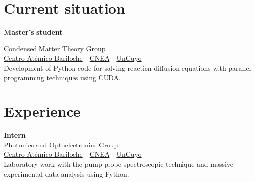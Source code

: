 \documentclass[a4paper,10pt]{article}
\begin{document}
\hfill
%
\begin{adjustbox}{valign=t}
\begin{minipage}{0.5\textwidth} %
\section*{Current situation}
\begin{description}
\raggedright
\item[\normalfont \textcolor{ColorOne}{Aug. 2021 -- Dec. 2022.}] \textbf{Master's student}\\ \medskip

\href{https://fisica.cab.cnea.gov.ar/solidos/}{\textcolor{ColorTwo}{Condensed Matter Theory Group}} \\ 
\href{https://fisica.cab.cnea.gov.ar/}{\textcolor{ColorTwo}{Centro Atómico Bariloche}} 
\textcolor{ColorTwo}{-} \href{https://www.argentina.gob.ar/cnea}{\textcolor{ColorTwo}{CNEA}} \textcolor{ColorTwo}{-}
\href{https://www.uncuyo.edu.ar/}{\textcolor{ColorTwo}{UnCuyo}}\\

Development of Python code for solving reaction-diffusion equations with parallel programming techniques using CUDA.

\end{description}
\vspace*{-.6cm}

\section*{Experience}
\begin{description}
\raggedright
\item[\normalfont \textcolor{ColorOne}{May. 2021 -- Sep. 2021.}] \textbf{Intern}\\ \medskip
\href{https://fisica.cab.cnea.gov.ar/pop/}{\textcolor{ColorTwo}{Photonics and Optoelectronics Group}}\\	
\href{https://fisica.cab.cnea.gov.ar/}{\textcolor{ColorTwo}{Centro Atómico Bariloche}} 
\textcolor{ColorTwo}{-} \href{https://www.argentina.gob.ar/cnea}{\textcolor{ColorTwo}{CNEA}} \textcolor{ColorTwo}{-}
\href{https://www.uncuyo.edu.ar/}{\textcolor{ColorTwo}{UnCuyo}}\\
Laboratory work with the pump-probe spectroscopic technique and massive experimental data analysis using Python.


\end{description}
\end{minipage}
\end{adjustbox}
\end{document}
